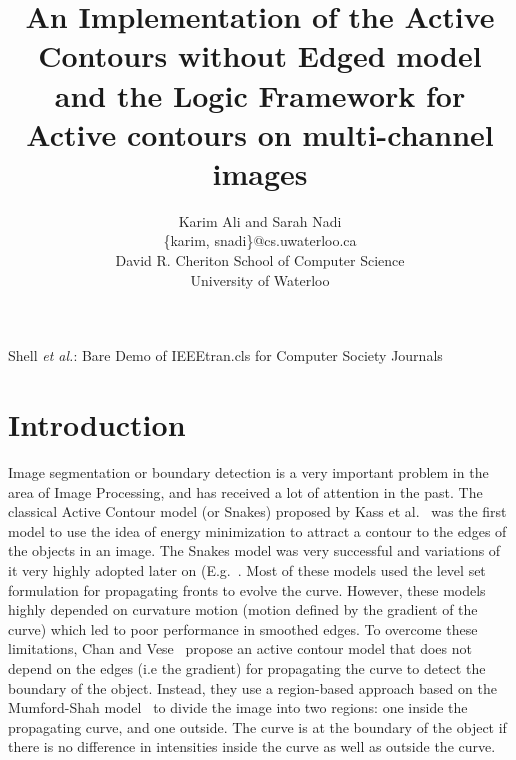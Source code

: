 \documentclass[10pt,journal,letterpaper,compsoc]{IEEEtran}
\begin{document}
\title{An Implementation of the Active Contours without Edged model and the Logic Framework for Active contours on multi-channel images}

\author{Karim Ali and Sarah Nadi\\
\{karim, snadi\}@cs.uwaterloo.ca \\
David R. Cheriton School of Computer Science\\
University of Waterloo\\
}



%
{Shell \MakeLowercase{\textit{et al.}}: Bare Demo of IEEEtran.cls for Computer Society Journals}



\maketitle



\section{Introduction}
Image segmentation or boundary detection is a very important problem in the area of Image Processing, and has received a lot of attention in the past. The
classical Active Contour model (or Snakes) proposed by Kass et al.~\cite{kass1988snakes} was the first model to use the idea of energy minimization to attract
a contour to the edges of the objects in an image. The Snakes model was very successful and variations of it very highly adopted later on
(E.g.~\cite{caselles1997geodesic}. Most of these models used the level set formulation for propagating fronts to evolve the curve. However, these models highly
depended on curvature motion (motion defined by the gradient of the curve) which led to poor performance in smoothed edges. To overcome these limitations, Chan
and Vese~\cite{chan2001active} propose an active contour model that does not depend on the edges (i.e the gradient) for propagating the curve to detect the
boundary of the object. Instead, they use a region-based approach based on the Mumford-Shah model~\cite{mumford1989optimal} to divide the image
into two regions: one inside the propagating curve, and one outside. The curve is at the boundary of the object if there is no difference in intensities inside
the curve as well as outside the curve.
\end{document}
